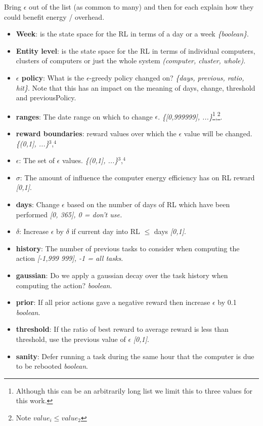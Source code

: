 \documentclass[10pt, conference, compsocconf]{IEEEtran}
\begin{document}
{\color{red}Bring $\epsilon$ out of the list (as common to many) and then for each explain how they could benefit energy / overhead.}

\begin{itemize}
	\item {\bf Week}: is the state space for the RL in terms of a day or a week {\em \{boolean\}}.
	\item {\bf Entity level}: is the state space for the RL in terms of individual computers, clusters of computers or just the whole system {\em (computer, cluster, whole)}.
	\item {\bf $\epsilon$ policy}: What is the $\epsilon$-greedy policy changed on? {\em \{days, previous, ratio, hit\}}. Note that this has an impact on the meaning of days, change, threshold and previousPolicy.
	\item {\bf ranges}: The date range on which to change $\epsilon$. {\em \{[0,999999], ...\}}\footnote{Although this can be an arbitrarily long list we limit this to three values for this work.},\footnote{Note $value_i \leq value_2$}.
	\item {\bf reward boundaries}: reward values over which the $\epsilon$ value will be changed. {\em \{(0,1], ...\}}$^3$,$^4$
	\item {\bf $\epsilon$}: The set of $\epsilon$ values. {\em \{(0,1], ...\}}$^3$,$^4$
	\item {\bf $\sigma$}: The amount of influence the computer energy efficiency has on RL reward {\em [0,1]}.
	\item {\bf days}: Change $\epsilon$ based on the number of days of RL which have been performed {\em [0, 365], 0 = don't use.}
	\item {\bf $\delta$}: Increase $\epsilon$ by $\delta$ if current day into RL	$\leq$ days {\em [0,1]}.
	\item {\bf history}: The number of previous tasks to consider when computing the action {\em [-1,999		999], -1 = all tasks}.
	\item {\bf gaussian}: Do we apply a gaussian decay over the task history when computing the action? {\em boolean}.
	\item {\bf prior}: If all prior actions gave a negative reward then increase $\epsilon$ by 0.1 {\em boolean}.
	\item {\bf threshold}: If the ratio of best reward to average reward is less than threshold, use the previous value of $\epsilon$ {\em [0,1]}.
	\item {\bf sanity}: Defer running a task during the same hour that the computer is due to be rebooted {\em boolean}.
\end{itemize}
                                                                
\end{document}

